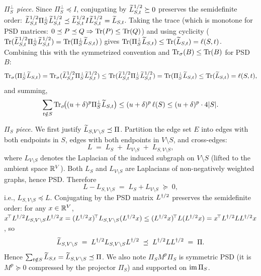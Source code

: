 \smallskip
\emph{$\Pi_S^\perp$ piece.}\quad
Since $\Pi_S^\perp\preceq I$, conjugating by $\widetilde{L}_{S,t}^{1/2}\succeq0$ preserves
the semidefinite order: $\widetilde{L}_{S,t}^{1/2}\Pi_S^\perp\widetilde{L}_{S,t}^{1/2}\preceq
\widetilde{L}_{S,t}^{1/2}I\widetilde{L}_{S,t}^{1/2}=\widetilde{L}_{S,t}$.
Taking the trace (which is monotone for PSD matrices: $0\preceq P\preceq Q\Rightarrow\operatorname{Tr}(P)\le\operatorname{Tr}(Q)$) and using cyclicity ($\operatorname{Tr}(\widetilde{L}_{S,t}^{1/2}\Pi_S^\perp\widetilde{L}_{S,t}^{1/2})=\operatorname{Tr}(\Pi_S^\perp\widetilde{L}_{S,t})$) gives
$\operatorname{Tr}(\Pi_S^\perp\widetilde{L}_{S,t})\le\operatorname{Tr}(\widetilde{L}_{S,t})=\ell(S,t)$.
Combining this with the symmetrized convention and $\operatorname{Tr}_{\sigma}(B)\le\operatorname{Tr}(B)$ for PSD $B$:
\[
  \operatorname{Tr}_{\sigma}(\Pi_S^\perp\widetilde{L}_{S,t})
    =\operatorname{Tr}_{\sigma}(\widetilde{L}_{S,t}^{1/2}\Pi_S^\perp\widetilde{L}_{S,t}^{1/2})
    \le\operatorname{Tr}(\widetilde{L}_{S,t}^{1/2}\Pi_S^\perp\widetilde{L}_{S,t}^{1/2})
    =\operatorname{Tr}(\Pi_S^\perp\widetilde{L}_{S,t})
    \le\operatorname{Tr}(\widetilde{L}_{S,t})=\ell(S,t),
\]
and summing,
\[
  \sum_{t\notin S}\operatorname{Tr}_{\sigma}\!\bigl((u+\delta)^p\Pi_S^\perp\widetilde{L}_{S,t}\bigr)
   \le (u+\delta)^p\,\ell(S)\le (u+\delta)^p\cdot 4|S|.
\]

\smallskip
\emph{$\Pi_S$ piece.}\quad
We first justify $\widetilde{L}_{S,V\setminus S}\preceq\Pi$.
Partition the edge set $E$ into edges with both endpoints in $S$,
edges with both endpoints in $V\setminus S$, and cross-edges:
\[
  L \;=\; L_S \;+\; L_{V\setminus S} \;+\; L_{S,V\setminus S},
\]
where $L_{V\setminus S}$ denotes the Laplacian of the induced subgraph
on $V\setminus S$ (lifted to the ambient space $\mathbb{R}^V$).  Both $L_S$
and $L_{V\setminus S}$ are Laplacians of non-negatively weighted graphs,
hence PSD.  Therefore
\[
  L - L_{S,V\setminus S} \;=\; L_S + L_{V\setminus S} \;\succeq\; 0,
\]
i.e., $L_{S,V\setminus S}\preceq L$.  Conjugating by the PSD matrix
$L^{\dagger/2}$ preserves the semidefinite order: for any $x\in\mathbb{R}^V$,
$x^{\!\top}L^{\dagger/2} L_{S,V\setminus S}L^{\dagger/2} x
 =(L^{\dagger/2} x)^{\!\top}L_{S,V\setminus S}(L^{\dagger/2} x)
 \le (L^{\dagger/2} x)^{\!\top}L(L^{\dagger/2} x)
 =x^{\!\top}L^{\dagger/2} LL^{\dagger/2} x$, so
\[
  \widetilde{L}_{S,V\setminus S}
   \;=\; L^{\dagger/2} L_{S,V\setminus S}L^{\dagger/2}
   \;\preceq\; L^{\dagger/2} LL^{\dagger/2} \;=\; \Pi.
\]
Hence $\sum_{t\notin S}\widetilde{L}_{S,t}=\widetilde{L}_{S,V\setminus S}\preceq\Pi$.
We also note $\Pi_S M^p\Pi_S$ is symmetric PSD (it is $M^p\succeq0$ compressed by
the projector $\Pi_S$) and supported on $\operatorname{im}\Pi_S$.

